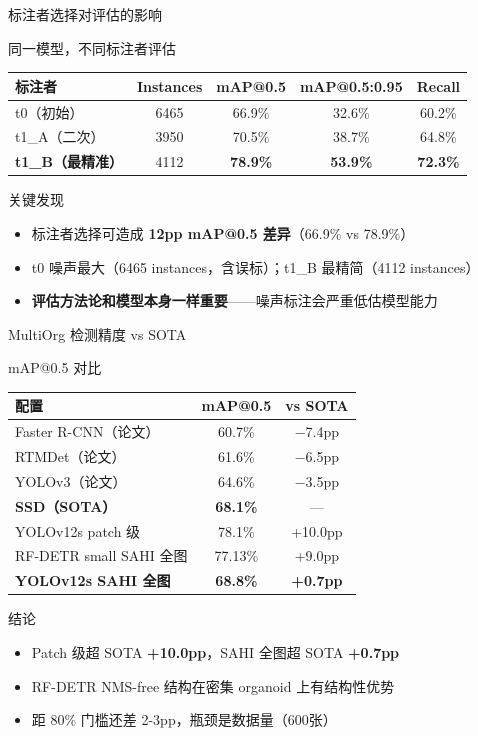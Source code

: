 \documentclass[aspectratio=169, 10pt]{beamer}
\begin{document}
\begin{frame}{标注者选择对评估的影响}
  \begin{block}{同一模型，不同标注者评估}
    \begin{tabular}{lcccc}
      \toprule
      标注者 & Instances & mAP@0.5 & mAP@0.5:0.95 & Recall \\
      \midrule
      t0（初始） & 6465 & 66.9\% & 32.6\% & 60.2\% \\
      t1\_A（二次） & 3950 & 70.5\% & 38.7\% & 64.8\% \\
      \textbf{t1\_B（最精准）} & 4112 & \textbf{78.9\%} & \textbf{53.9\%} & \textbf{72.3\%} \\
      \bottomrule
    \end{tabular}
  \end{block}
  \vspace{0em}
  \begin{alertblock}{关键发现}
    \begin{itemize}
      \item 标注者选择可造成 \textbf{12pp mAP@0.5 差异}（66.9\% vs 78.9\%）
      \item t0 噪声最大（6465 instances，含误标）；t1\_B 最精简（4112 instances）
      \item \textbf{评估方法论和模型本身一样重要}——噪声标注会严重低估模型能力
    \end{itemize}
  \end{alertblock}
\end{frame}

\begin{frame}{MultiOrg 检测精度 vs SOTA}
  \begin{block}{mAP@0.5 对比}
    \begin{tabular}{lcc}
      \toprule
      配置 & mAP@0.5 & vs SOTA \\
      \midrule
      Faster R-CNN（论文） & 60.7\% & $-$7.4pp \\
      RTMDet（论文） & 61.6\% & $-$6.5pp \\
      YOLOv3（论文） & 64.6\% & $-$3.5pp \\
      \textbf{SSD（SOTA）} & \textbf{68.1\%} & — \\
      \midrule
      YOLOv12s patch 级 & 78.1\% & +10.0pp \\
      RF-DETR small SAHI 全图 & 77.13\% & +9.0pp \\
      \textbf{YOLOv12s SAHI 全图} & \textbf{68.8\%} & \textbf{+0.7pp} \\
      \bottomrule
    \end{tabular}
  \end{block}
  \vspace{0em}
  \begin{alertblock}{结论}
    \begin{itemize}
      \item Patch 级超 SOTA \textbf{+10.0pp}，SAHI 全图超 SOTA \textbf{+0.7pp}
      \item RF-DETR NMS-free 结构在密集 organoid 上有结构性优势
      \item 距 80\% 门槛还差 2-3pp，瓶颈是数据量（600张）
    \end{itemize}
  \end{alertblock}
\end{frame}
\end{document}
